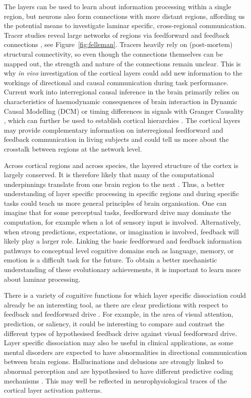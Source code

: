 The layers can be used to learn about information processing within a single region, but neurons also form connections with more distant regions, affording us the potential means to investigate laminar specific, cross-regional communication. Tracer studies reveal large networks of regions via feedforward and feedback connections \cite{Felleman1991}, see Figure~\ref{fig:felleman}. Tracers heavily rely on (post-mortem) structural connectivity, so even though the connections themselves can be mapped out, the strength and nature of the connections remain unclear. This is why \emph{in vivo} investigation of the cortical layers could add new information to the workings of directional and causal communication during task performance. Current work into interregional causal inference in the brain primarily relies on characteristics of haemodynamic consequences of brain interaction in Dynamic Causal Modelling (DCM) \cite{Friston2009} or timing differences in signals with Granger Causality \cite{Aalen2007}, which can further be used to establish cortical hierarchies \cite{Michalareas2016}. The cortical layers may provide complementary information on interregional feedforward and feedback communication in living subjects and could tell us more about the crosstalk between regions at the network level.


Across cortical regions and across species, the layered structure of the cortex is largely conserved. It is therefore likely that many of the computational underpinnings translate from one brain region to the next \cite{Buonomano1998}. Thus, a better understanding of layer specific processing in specific regions and during specific tasks could teach us more general principles of brain organisation. One can imagine that for some perceptual tasks, feedforward drive may dominate the computation, for example when a lot of sensory input is involved. Alternatively, when strong predictions, expectations, or imagination is involved, feedback will likely play a larger role. Linking the basic feedforward and feedback information pathways to conceptual level cognitive domains such as language, memory, or emotion is a difficult task for the future. To obtain a better mechanistic understanding of these evolutionary achievements, it is important to learn more about laminar processing.

There is a variety of cognitive functions for which layer specific dissociation could already be an interesting tool, as there are clear predictions with respect to feedback and feedforward drive \cite{Lawrence2017}. For example, in the area of visual attention, prediction, or saliency, it could be interesting to compare and contrast the different types of hypothesised feedback drive against visual feedforward drive. Layer specific dissociation may also be useful in clinical applications, as some mental disorders are expected to have abnormalities in directional communication between brain regions. Hallucinations and delusions are strongly linked to abnormal perception and are hypothesised to have different predictive coding mechanisms \cite{Fletcher2008}. This may well be reflected in neurophysiological traces of the cortical layer activation patterns.

